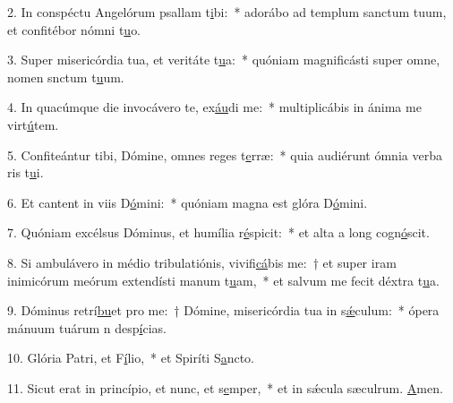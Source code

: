 2. In conspéctu Angelórum psallam t\uline{i}bi:~* adorábo ad templum sanctum tuum, et confitébor nómni t\uline{u}o.\par 
3. Super misericórdia tua, et veritáte t\uline{u}a:~* quóniam magnificásti super omne, nomen snctum t\uline{u}um.\par 
4. In quacúmque die invocávero te, ex\uline{áu}di me:~* multiplicábis in ánima me virt\uline{ú}tem.\par 
5. Confiteántur tibi, Dómine, omnes reges t\uline{e}rræ:~* quia audiérunt ómnia verba ris t\uline{u}i.\par 
6. Et cantent in viis D\uline{ó}mini:~* quóniam magna est glóra D\uline{ó}mini.\par 
7. Quóniam excélsus Dóminus, et humília r\uline{é}spicit:~* et alta a long cogn\uline{ó}scit.\par 
8. Si ambulávero in médio tribulatiónis, vivifi\uline{cá}bis me:~† et super iram inimicórum meórum extendísti manum t\uline{u}am,~* et salvum me fecit déxtra t\uline{u}a.\par 
9. Dóminus retrí\uline{bu}et pro me:~† Dómine, misericórdia tua in s\uline{ǽ}culum:~* ópera mánuum tuárum n desp\uline{í}cias.\par 
10. Glória Patri, et F\uline{í}lio,~* et Spiríti S\uline{a}ncto.\par 
11. Sicut erat in princípio, et nunc, et s\uline{e}mper,~* et in sǽcula sæculrum. \uline{A}men.\par 
